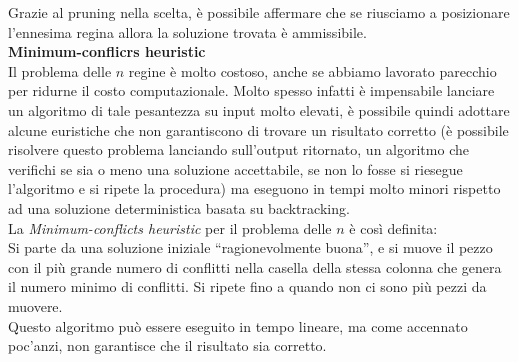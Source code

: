 \documentclass[../cheatSheetAlgoritmi.tex]{subfiles}
\begin{document}
Grazie al pruning nella scelta, è possibile affermare che se riusciamo a posizionare l'ennesima regina allora la soluzione trovata è ammissibile. \\
\textbf{Minimum-conflicrs heuristic} \\
Il problema delle $n$ regine è molto costoso, anche se abbiamo lavorato parecchio per ridurne il costo computazionale. Molto spesso infatti è impensabile lanciare un algoritmo di tale pesantezza su input molto elevati, è possibile quindi adottare alcune euristiche che non garantiscono di trovare un risultato corretto (è possibile risolvere questo problema lanciando sull'output ritornato, un algoritmo che verifichi se sia o meno una soluzione accettabile, se non lo fosse si riesegue l'algoritmo e si ripete la procedura) ma eseguono in tempi molto minori rispetto ad una soluzione deterministica basata su backtracking. \\
La \emph{Minimum-conflicts heuristic} per il problema delle $n$ è così definita: \\
Si parte da una soluzione iniziale “ragionevolmente buona”, e si muove il pezzo con il più grande numero di conflitti nella casella della stessa colonna che genera il numero minimo di conflitti. Si ripete fino a quando non ci sono più pezzi da muovere. \\
Questo algoritmo può essere eseguito in tempo lineare, ma come accennato poc'anzi, non garantisce che il risultato sia corretto.
\end{document}
